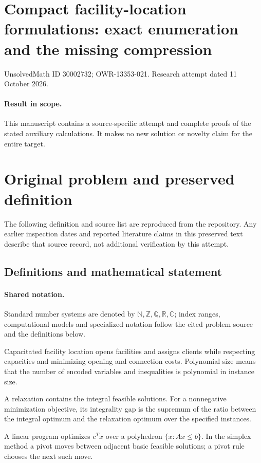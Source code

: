 \documentclass[11pt]{article}
\begin{document}
\section*{Compact facility-location formulations: exact enumeration and the missing compression}
\noindent UnsolvedMath ID 30002732; OWR-13353-021. Research attempt dated 11 October 2026.
\paragraph{Result in scope.}This manuscript contains a source-specific attempt and complete proofs of the stated auxiliary calculations. It makes no new solution or novelty claim for the entire target.
\section{Original problem and preserved definition}
The following definition and source list are reproduced from the repository. Any earlier inspection dates and reported literature claims in this preserved text describe that source record, not additional verification by this attempt.
\subsection{Definitions and mathematical statement}

\paragraph{Shared notation.}Standard number systems are denoted by $\mathbb N,\mathbb Z,\mathbb Q,\mathbb R,\mathbb C$; index ranges, computational models and specialized notation follow the cited problem source and the definitions below.


Capacitated facility location opens facilities and assigns clients while respecting capacities and minimizing opening and connection costs. Polynomial size means that the number of encoded variables and inequalities is polynomial in instance size.

A relaxation contains the integral feasible solutions. For a nonnegative minimization objective, its integrality gap is the supremum of the ratio between the integral optimum and the relaxation optimum over the specified instances.

A linear program optimizes $c^Tx$ over a polyhedron $\{x:Ax\leq b\}$. In the simplex method a pivot moves between adjacent basic feasible solutions; a pivot rule chooses the next such move.
\end{document}
